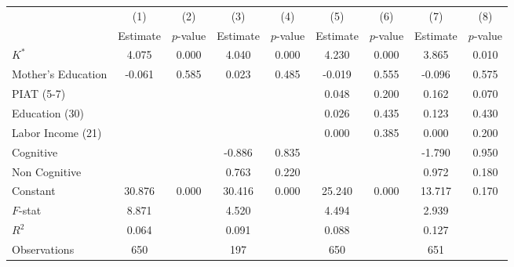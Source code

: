 \begin{tabular}{lcccccccc} \toprule
 & (1) & (2) & (3) & (4) & (5) & (6) & (7) & (8)\\
 & Estimate  & $p$-value  & Estimate  & $p$-value  & Estimate  & $p$-value  & Estimate  & $p$-value  \\  \midrule
$K^\ast$ &     4.075 &     0.000 &     4.040 &     0.000 &     4.230 &     0.000 &     3.865 &     0.010 \\
Mother's Education &    -0.061 &     0.585 &     0.023 &     0.485 &    -0.019 &     0.555 &    -0.096 &     0.575 \\
PIAT (5-7) &         &         &         &         &     0.048 &     0.200 &     0.162 &     0.070 \\
Education (30) &         &         &         &         &     0.026 &     0.435 &     0.123 &     0.430 \\
Labor Income (21) &         &         &         &         &     0.000 &     0.385 &     0.000 &     0.200 \\
Cognitive &         &         &    -0.886 &     0.835 &         &         &    -1.790 &     0.950 \\
Non Cognitive &         &         &     0.763 &     0.220 &         &         &     0.972 &     0.180 \\
Constant &    30.876 &     0.000 &    30.416 &     0.000 &    25.240 &     0.000 &    13.717 &     0.170 \\  \midrule
$F$-stat &     8.871 &         &     4.520 &         &     4.494 &         &     2.939 &         \\
$R^2$ &     0.064 &         &     0.091 &         &     0.088 &         &     0.127 &          \\
Observations &   650 &         &   197 &         &   650 &         &   651 &          \\
\midrule \end{tabular}

